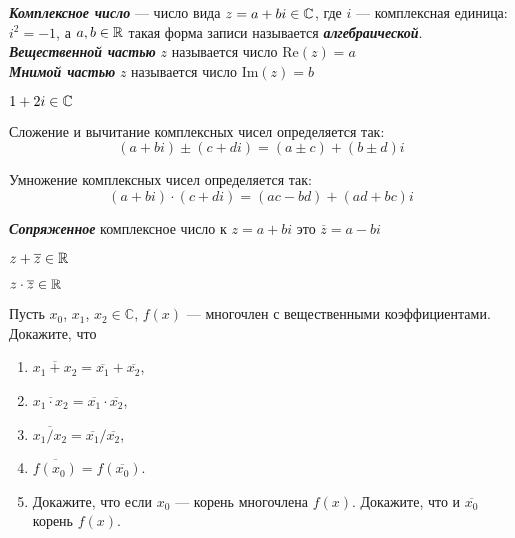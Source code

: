 \documentclass{article}
\begin{document}
    \large

    \setcounter{task_boxed}{0}

    \begin{definition_boxed}
        \textbf{\textit{Комплексное число}} — число вида $z = a+bi \in \mathbb{C}$, где $i$ — комплексная единица: $i^2 = -1$, а $a, b \in \mathbb{R}$ такая форма записи называется \textbf{\textit{алгебраической}}.\\
        \textbf{\textit{Вещественной частью}} $z$ называется число $\text{Re}(z) = a$\\
        \textbf{\textit{Мнимой частью}} $z$ называется число $\text{Im}(z) = b$
    \end{definition_boxed}

    \begin{example}
        $1 + 2i \in \mathbb{C}$
    \end{example}

    \begin{definition_boxed}
        Сложение и вычитание комплексных чисел определяется так:
        \[(a + bi) \pm (c + di) = (a \pm c) + (b \pm d)i\]
    \end{definition_boxed}

    \begin{definition_boxed}
        Умножение комплексных чисел определяется так:
        \[(a + bi) \cdot (c + di) = (ac - bd) + (ad + bc)i\]
    \end{definition_boxed}

    \begin{definition_boxed}
        \textbf{\textit{Сопряженное}} комплексное число к $z = a + bi$ это $\overline{z} = a - bi$
    \end{definition_boxed}

    \begin{example}
        $z + \overline{z} \in \mathbb{R}$
    \end{example}

    \begin{example}
        $z \cdot \overline{z} \in \mathbb{R}$
    \end{example}

    \begin{task_boxed}
        Пусть $x_0$, $x_1$, $x_2\in \mathbb{C}$, $f(x)$ --- многочлен с вещественными коэффициентами.
        Докажите, что
        \begin{enumerate}
            \item $\overline{x_1+x_2}=\overline{x_1}+\overline{x_2}$,
            \item $\overline{x_1\cdot x_2}=\overline{x_1}\cdot \overline{x_2}$,
            \item $\overline{x_1/x_2}=\overline{x_1}/\overline{x_2}$,
            \item $\overline{f(x_0)}=f(\overline{x_0})$.
            \item Докажите, что если $x_0$ --- корень многочлена $f(x)$.
            Докажите, что и $\overline{x_0}$ корень $f(x)$.
        \end{enumerate}
    \end{task_boxed}
\end{document}
